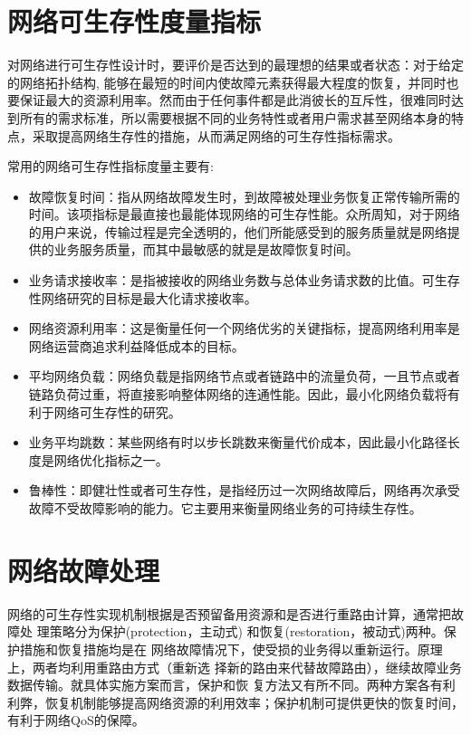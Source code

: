 \section{网络可生存性度量指标}
对网络进行可生存性设计时，要评价是否达到的最理想的结果或者状态：对于给定的网络拓扑结构, 能够在最短的时间内使故障元素获得最大程度的恢复，并同时也要保证最大的资源利用率\cite{wangxiujun2008}。然而由于任何事件都是此消彼长的互斥性，很难同时达到所有的需求标准，所以需要根据不同的业务特性或者用户需求甚至网络本身的特点，采取提高网络生存性的措施，从而满足网络的可生存性指标需求。

常用的网络可生存性指标度量主要有:
\begin{itemize}
  \item 故障恢复时间：指从网络故障发生时，到故障被处理业务恢复正常传输所需的时间。该项指标是最直接也最能体现网络的可生存性能。众所周知，对于网络的用户来说，传输过程是完全透明的，他们所能感受到的服务质量就是网络提供的业务服务质量，而其中最敏感的就是是故障恢复时间。
  \item 业务请求接收率：是指被接收的网络业务数与总体业务请求数的比值。可生存性网络研究的目标是最大化请求接收率。
  \item 网络资源利用率：这是衡量任何一个网络优劣的关键指标，提高网络利用率是网络运营商追求利益降低成本的目标。
  \item 平均网络负载：网络负载是指网络节点或者链路中的流量负荷，一且节点或者链路负荷过重，将直接影响整体网络的连通性能。因此，最小化网络负载将有利于网络可生存性的研究。
  \item 业务平均跳数：某些网络有时以步长跳数来衡量代价成本，因此最小化路径长度是网络优化指标之一。
  \item 鲁棒性：即健壮性或者可生存性，是指经历过一次网络故障后，网络再次承受故障不受故障影响的能力。它主要用来衡量网络业务的可持续生存性。
\end{itemize}



\section{网络故障处理}
网络的可生存性实现机制根据是否预留备用资源和是否进行重路由计算，通常把故障处 理策略分为保护(protection，主动式) 和恢复(restoration，被动式)两种\cite{kvalbein2009multiple}。保护措施和恢复措施均是在 网络故障情况下，使受损的业务得以重新运行。原理上，两者均利用重路由方式（重新选 择新的路由来代替故障路由），继续故障业务数据传输。就具体实施方案而言，保护和恢 复方法又有所不同。两种方案各有利利弊，恢复机制能够提高网络资源的利用效率；保护机制可提供更快的恢复时间，有利于网络QoS的保障。

